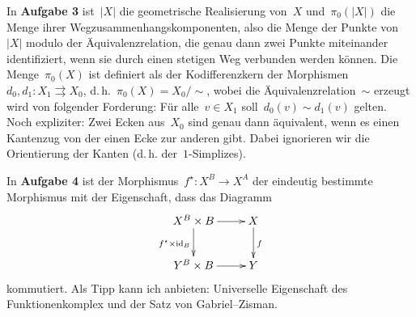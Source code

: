 \documentclass{uebblatt}
\begin{document}
In \textbf{Aufgabe 3} ist~$|X|$ die geometrische Realisierung von~$X$
und~$\pi_0(|X|)$ die Menge ihrer Wegzusammenhangskomponenten, also die Menge
der Punkte von~$|X|$ modulo der Äquivalenzrelation, die genau dann zwei Punkte
miteinander identifiziert, wenn sie durch einen stetigen Weg verbunden werden
können. Die Menge~$\pi_0(X)$ ist definiert als der Kodifferenzkern der
Morphismen~$d_0, d_1 : X_1 \rightrightarrows X_0$, d.\,h.~$\pi_0(X) =
X_0/{\sim}$, wobei die Äquivalenzrelation~$\sim$ erzeugt wird von folgender
Forderung: Für alle~$v \in X_1$ soll~$d_0(v) \sim d_1(v)$ gelten. Noch
expliziter: Zwei Ecken aus~$X_0$ sind genau dann äquivalent, wenn es einen
Kantenzug von der einen Ecke zur anderen gibt. Dabei ignorieren wir die
Orientierung der Kanten (d.\,h. der~$1$-Simplizes).

In \textbf{Aufgabe 4} ist der Morphismus~$f^\star : X^B \to X^A$ der eindeutig
bestimmte Morphismus mit der Eigenschaft, dass das Diagramm
\[ \xymatrix{
  X^B \times B \ar[r] \ar[d]_{f^\star \times \id_B} & X \ar[d]^f \\
  Y^B \times B \ar[r] & Y
} \]
kommutiert. Als Tipp kann ich anbieten: Universelle Eigenschaft des
Funktionenkomplex und der Satz von Gabriel--Zisman.
\end{document}
